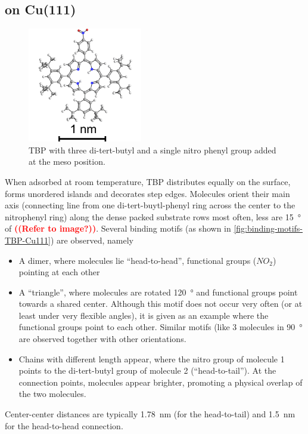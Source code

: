 	\subsection{on Cu(111)}
	\label{sec:single-TBP-Cu111}
	\begin{figure}\centering
		\includegraphics[width=5cm]{./images/molecules/max-zoom/TBP-single-600-scalebar}
		\caption{TBP with three di-tert-butyl and a single nitro phenyl group added at the meso position.}
		\label{fig:}
	\end{figure}
	When adsorbed at room temperature, TBP distributes equally on the surface, forms unordered islands and decorates step edges. Molecules orient their main axis (connecting line from one di-tert-buytl-phenyl ring across the center to the nitrophenyl ring) along the dense packed substrate rows most often, less are \SI{15}{\degree} of \textcolor{red}{\textbf{((Refer to image?))}}. Several binding motifs (as shown in \autoref{fig:binding-motifs-TBP-Cu111}) are observed, namely
	\begin{itemize}
		\item A dimer, where molecules lie ``head-to-head'', functional groups ($NO_2$) pointing at each other
		\item A ``triangle'', where molecules are rotated \SI{120}{\degree} and functional groups point towards a shared center. Although this motif does not occur very often (or at least under very flexible angles), it is given as an example where the functional groups point to each other. Similar motifs (like 3 molecules in \SI{90}{\degree} are observed together with other orientations. 
		\item Chains with different length appear, where the nitro group of molecule 1 points to the di-tert-butyl group of molecule 2 (``head-to-tail''). At the connection points, molecules appear brighter, promoting a physical overlap of the two molecules.
	\end{itemize}
	
	Center-center distances are typically \SI{1.78}{\nano \meter} (for the head-to-tail) and \SI{1.5}{\nano \meter} for the head-to-head connection. 
	
